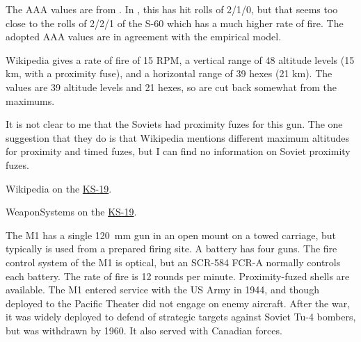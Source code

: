 \begin{withcounters}
{        

        

        The AAA values are from {\AirStr}.
        In {\MPC}, this has hit rolls of 2/1/0, but that seems too close to the rolls of 2/2/1 of the S-60 which has a much higher rate of fire.
        The adopted AAA values are in agreement with the empirical model.

        Wikipedia gives a rate of fire of 15 RPM, a vertical range of 48 altitude levels (15 km, with a proximity fuse), and a horizontal range of 39 hexes (21 km). The {\AirStr} values are 39 altitude levels and 21 hexes, so are cut back somewhat from the maximums.

        It is not clear to me that the Soviets had proximity fuzes for this gun. The one suggestion that they do is that Wikipedia mentions different maximum altitudes for proximity and timed fuzes, but I can find no information on Soviet proximity fuzes.

        \begin{notesources}
            \item Wikipedia on the \href{https://en.wikipedia.org/wiki/KS-19}{KS-19}.
            \item WeaponSystems on the \href{https://weaponsystems.net/system/422-KS-19}{KS-19}.
        \end{notesources}
    }


    The M1 has a single 120~mm gun in an open mount on a towed carriage, but typically is used from a prepared firing site. A battery has four guns.
    The fire control system of the M1 is optical, but an SCR-584 FCR-A normally controls each battery. The rate of fire is 12 rounds per minute.
    Proximity-fuzed shells are available.
    The M1 entered service with the US Army in 1944, and though deployed to the Pacific Theater did not engage on enemy aircraft. After the war, it was widely deployed to defend of strategic targets against Soviet Tu-4 bombers, but was withdrawn by 1960. It also served with Canadian forces.%
\end{withcounters}
